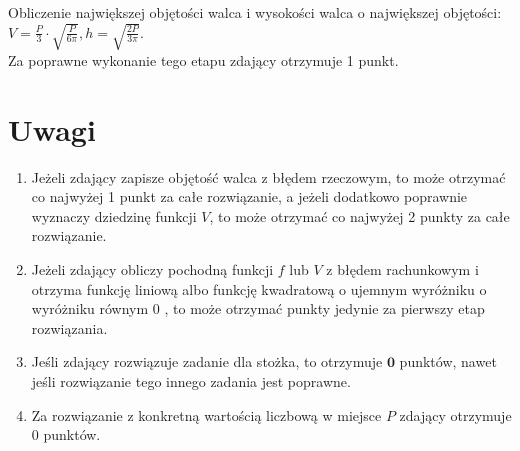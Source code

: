 \documentclass[10pt]{article}
\begin{document}
Obliczenie największej objętości walca i wysokości walca o największej objętości:\\
$V=\frac{P}{3} \cdot \sqrt{\frac{P}{6 \pi}}, h=\sqrt{\frac{2 P}{3 \pi}}$.\\
Za poprawne wykonanie tego etapu zdający otrzymuje 1 punkt.

\section*{Uwagi}
\begin{enumerate}
  \item Jeżeli zdający zapisze objętość walca z błędem rzeczowym, to może otrzymać co najwyżej 1 punkt za całe rozwiązanie, a jeżeli dodatkowo poprawnie wyznaczy dziedzinę funkcji $V$, to może otrzymać co najwyżej 2 punkty za całe rozwiązanie.
  \item Jeżeli zdający obliczy pochodną funkcji $f$ lub $V$ z błędem rachunkowym i otrzyma funkcję liniową albo funkcję kwadratową o ujemnym wyróżniku o wyróżniku równym 0 , to może otrzymać punkty jedynie za pierwszy etap rozwiązania.
  \item Jeśli zdający rozwiązuje zadanie dla stożka, to otrzymuje $\mathbf{0}$ punktów, nawet jeśli rozwiązanie tego innego zadania jest poprawne.
  \item Za rozwiązanie z konkretną wartością liczbową w miejsce $P$ zdający otrzymuje 0 punktów.
\end{enumerate}
\end{document}
